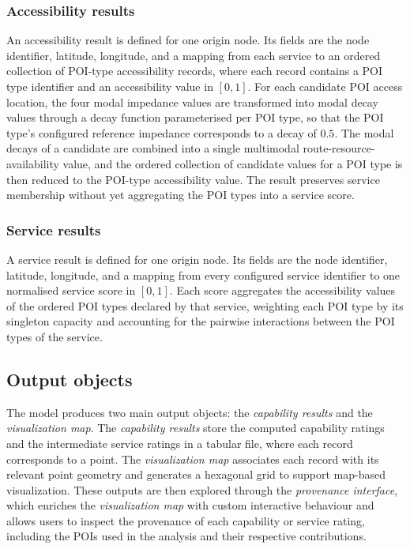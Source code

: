 \documentclass{article}
\begin{document}
\subsubsection*{Accessibility results}
    An accessibility result is defined for one origin node. Its fields are the node
    identifier, latitude, longitude, and a mapping from each service to an ordered
    collection of POI-type accessibility records, where each record contains a POI
    type identifier and an accessibility value in $[0,1]$. For each candidate POI
    access location, the four modal impedance values are transformed into modal
    decay values through a decay function parameterised per POI type, so that the
    POI type's configured reference impedance corresponds to a decay of $0.5$. The
    modal decays of a candidate are combined into a single multimodal
    route-resource-availability value, and the ordered collection of candidate
    values for a POI type is then reduced to the POI-type accessibility value. The
    result preserves service membership without yet aggregating the POI types into
    a service score.

\subsubsection*{Service results}
    A service result is defined for one origin node. Its fields are the node
    identifier, latitude, longitude, and a mapping from every configured service
    identifier to one normalised service score in $[0,1]$. Each score aggregates
    the accessibility values of the ordered POI types declared by that service,
    weighting each POI type by its singleton capacity and accounting for the
    pairwise interactions between the POI types of the service.


\subsection{Output objects}
The model produces two main output objects: the \emph{capability results} and the \emph{visualization map}. The \emph{capability results} store the computed capability ratings and the intermediate service ratings in a tabular file, where each record corresponds to a point. The \emph{visualization map} associates each record with its relevant point geometry and generates a hexagonal grid to support map-based visualization. These outputs are then explored through the \emph{provenance interface}, which enriches the \emph{visualization map} with custom interactive behaviour and allows users to inspect the provenance of each capability or service rating, including the POIs used in the analysis and their respective contributions.
\end{document}
